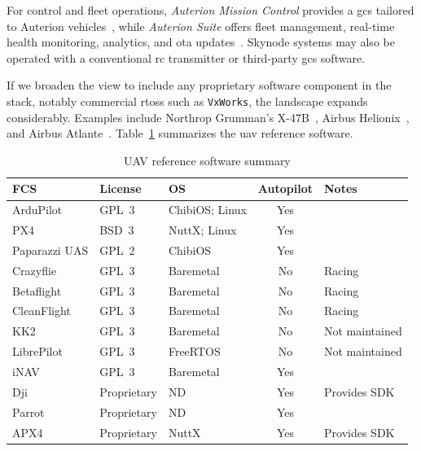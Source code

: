 For control and fleet operations, \emph{Auterion Mission Control} provides a \gls{gcs} tailored to Auterion vehicles~\cite{auterion-missionControl}, 
while \emph{Auterion Suite} offers fleet management, real-time health monitoring, analytics, and \gls{ota} updates~\cite{auterion-suite}. 
Skynode systems may also be operated with a conventional \gls{rc} transmitter or third-party \gls{gcs} software.

If we broaden the view to include any proprietary software component in the stack, 
notably commercial \glspl{rtos} such as \lstinline|VxWorks|, the landscape expands considerably. 
Examples include Northrop Grumman's X-47B~\cite{vxWorks-uav-northrop}, Airbus Helionix~\cite{vxWorks-uav-aribus-helionic}, and Airbus Atlante~\cite{vxWorks-uav-aribus-atlante}.
%
Table~\ref{tab:sw-ref} summarizes the \gls{uav} reference software.


\begin{table}[t]
  \centering
  \caption{UAV reference software summary}
  \label{tab:sw-ref}

  \begingroup
  \footnotesize
  \setlength{\tabcolsep}{4pt}      %
  \renewcommand{\arraystretch}{1.05}%

  \begin{tabular}{@{} l l l c l @{}}
    \toprule
    \textbf{FCS} & \textbf{License} & \textbf{OS} & \textbf{Autopilot} & \textbf{Notes} \\
    \midrule
    ArduPilot     & GPL~3        & ChibiOS; Linux & Yes & \\
    PX4           & BSD~3        & NuttX; Linux   & Yes & \\
    Paparazzi UAS & GPL~2        & ChibiOS        & Yes & \\
    Crazyflie     & GPL~3        & Baremetal      & No  & Racing \\
    Betaflight    & GPL~3        & Baremetal      & No  & Racing \\
    CleanFlight   & GPL~3        & Baremetal      & No  & Racing \\
    KK2           & GPL~3        & Baremetal      & No  & Not maintained \\
    LibrePilot    & GPL~3        & FreeRTOS       & No  & Not maintained \\
    iNAV          & GPL~3        & Baremetal      & Yes & \\
    Dji           & Proprietary  & ND             & Yes & Provides SDK \\
    Parrot        & Proprietary  & ND             & Yes & \\
    APX4          & Proprietary  & NuttX          & Yes & Provides SDK \\
    \bottomrule
  \end{tabular}

  \endgroup
\end{table}

